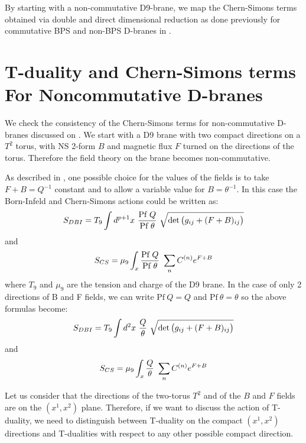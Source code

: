 \documentclass[a4paper,12pt]{article}
\begin{document}
By starting with a non-commutative D9-brane, we map the Chern-Simons terms
obtained 
via double and direct dimensional 
reduction as done previously for commutative 
BPS and non-BPS D-branes in \cite{al,b1,ga,b2,jm}.

\section{T-duality and Chern-Simons terms For Noncommutative D-branes}
We check the consistency of the Chern-Simons terms for
non-commutative D-branes discussed on \cite{ms}. 
We start with a D9 brane with two compact directions 
on a $T^2$ torus, with NS 2-form $B$  and magnetic flux $F$ turned on the
directions of the torus.
Therefore the field theory on the brane becomes non-commutative. 

As described in \cite{ms}, one possible choice for the values of the fields is
to take $F + B = Q^{-1}$ constant and to allow a variable value for 
$B = \theta^{-1}$. In this case the Born-Infeld and Chern-Simons actions could
be written as:
\begin{equation}
\label{dbi1}
 S_{DBI} =  T_9  \int d^{p+1} x~ {\mbox{Pf}~Q\over \mbox{Pf}~\theta} 
~\sqrt{\det\big(g_{ij} + (F + B)_{ij}\big)}
\end{equation}
and 
\begin{equation}
\label{cs1}
 S_{CS} = \mu_9 \int_x {\mbox{Pf}~Q\over \mbox{Pf}~\theta}
~\sum_n C^{(n)} e^{F + B} 
\end{equation}
where $T_9$ and $\mu_9$ are the tension and charge of the D9 brane. In the
case of only 2 directions of B and F fields, we can write 
$\mbox{Pf}~Q = Q$ and $\mbox{Pf}~\theta = \theta$ 
so the above formulas become:
\begin{equation}
\label{dbi2}
S_{DBI} =  T_9  \int d^{2} x~ {Q \over \theta} 
 ~\sqrt{\det\big(g_{ij} + (F + B)_{ij}\big)}
\end{equation}
and 
\begin{equation}
\label{cs2}
S_{CS} = \mu_9 \int_x {Q \over \theta}
 ~\sum_n C^{(n)} e^{F + B} 
\end{equation}

Let us consider that the directions of the two-torus $T^2$ and of the $B$ and 
$F$ fields are on the $(x^1, x^2)$ plane. Therefore, if we want to
discuss the action of T-duality, we need to distinguish between T-duality on
the compact $(x^1, x^2)$ directions and T-dualities with respect to any other 
possible compact direction. 
\end{document}
